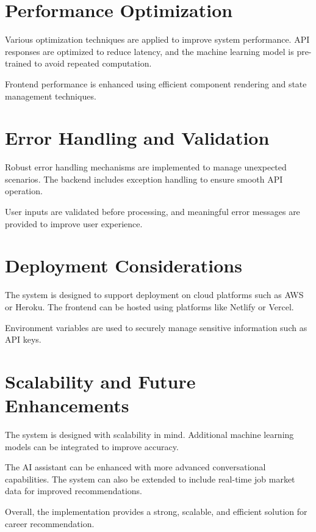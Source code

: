 \documentclass[12pt,a4paper]{report}
\begin{document}
{\section{Performance Optimization}

Various optimization techniques are applied to improve system performance. API responses are optimized to reduce latency, and the machine learning model is pre-trained to avoid repeated computation.

Frontend performance is enhanced using efficient component rendering and state management techniques.

\section{Error Handling and Validation}

Robust error handling mechanisms are implemented to manage unexpected scenarios. The backend includes exception handling to ensure smooth API operation.

User inputs are validated before processing, and meaningful error messages are provided to improve user experience.

\section{Deployment Considerations}

The system is designed to support deployment on cloud platforms such as AWS or Heroku. The frontend can be hosted using platforms like Netlify or Vercel.

Environment variables are used to securely manage sensitive information such as API keys.

\section{Scalability and Future Enhancements}

The system is designed with scalability in mind. Additional machine learning models can be integrated to improve accuracy.

The AI assistant can be enhanced with more advanced conversational capabilities. The system can also be extended to include real-time job market data for improved recommendations.

Overall, the implementation provides a strong, scalable, and efficient solution for career recommendation.

\clearpage
\setcounter{page}{41}

}
\end{document}
